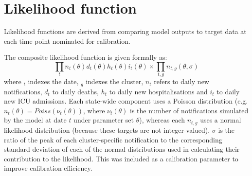 \section{Likelihood function}

Likelihood functions are derived from comparing model outputs to target data at each time point nominated for calibration.

The composite likelihood function is given formally as:
\[\prod_{t}{n_{t}(\theta)d_{t}(\theta)h_{t}(\theta)i_{t}(\theta)} \times \prod_{t,g}{n_{t,g}(\theta,\sigma)}\]
where \(_{t}\) indexes the date, \(_{g}\) indexes the cluster, \(n_{t}\) refers to daily new notifications, \(d_{t}\) to daily deaths, \(h_{t}\) to daily new hospitalisations and \(i_{t}\) to daily new ICU admissions. Each state-wide component uses a Poisson distribution (e.g. \(n_{t}(\theta)=Poiss(\nu_{t}(\theta))\), where \(\nu_{t}(\theta)\) is the number of notifications simulated by the model at date \(t\) under parameter set \(\theta\)), whereas each \(n_{t,g}\) uses a normal likelihood distribution (because these targets are not integer-valued). \(\sigma\) is the ratio of the peak of each cluster-specific notification to the corresponding standard deviation of each of the normal distributions used in calculating their contribution to the likelihood. This was included as a calibration parameter to improve calibration efficiency.